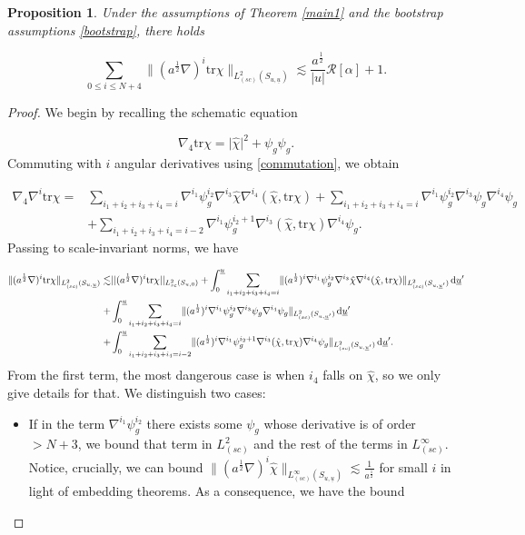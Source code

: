\documentclass{amsart}
\newtheorem{proposition}{Proposition}[section]
\newcommand{\aln}{(\al \nabla)^i}
\newcommand{\dubarprime}{\hspace{.5mm} \text{d} \ubar^{\prime}}
\newcommand{\intubar}{\int_0^{\ubar}}
\newcommand{\chihat}{\hat{\chi}}
\newcommand{\al}{a^{\frac{1}{2}}}
\newcommand{\ubar}{\underline{u}}
\newcommand{\sumifim}{\sum_{i_1+i_2+i_3+i_4=i-2}}
\newcommand{\scaleinfinitySu}[1]{\lVert{#1} \rVert_{L^\infty_{(sc)}(S_{u,\ubar})}}
\newcommand{\scaletwoSu}[1]{\lVert{#1} \rVert_{L^2_{(sc)}(S_{u,\ubar})}}
\newcommand{\scaletwoSuubarprime}[1]{\lVert{#1} \rVert_{L^2_{(sc)}(S_{u,\ubar^\prime})}}
\newcommand{\tr}{\mbox{tr}}
\begin{document}
{\begin{proposition}
\label{trchiprop}
Under the assumptions of Theorem \ref{main1} and the bootstrap assumptions \eqref{bootstrap}, there holds

\[ \sum_{0\leq i \leq N+4} \scaletwoSu{\aln \tr\chi}\lesssim \frac{a^{\frac{1}{2}}}{|u|}\mathcal{R}[\alpha]+1. \]
\end{proposition}

\begin{proof}
We begin by recalling the schematic equation

\[ \nabla_4 \tr\chi = \lvert \chihat \rvert^2 + \psi_g\psi_g. \]Commuting with $i$ angular derivatives using \ref{commutation}, we obtain

\begin{equation}
    \begin{split}
        \nabla_4 \nabla^i \tr\chi =& \sum_{i_1+i_2+i_3+i_4=i}\nabla^{i_1}\psi_g^{i_2}\nabla^{i_3}\chihat \nabla^{i_4}(\chihat, \tr\chi) +\sum_{i_1+i_2+i_3+i_4=i}\nabla^{i_1}\psi_g^{i_2}\nabla^{i_3}\psi_g \nabla^{i_4}\psi_g \\&+ \sumifim \nabla^{i_1}\psi_g^{i_2+1}\nabla^{i_3}(\chihat,\tr\chi)\nabla^{i_4}\psi_g .
    \end{split}
\end{equation}
Passing to scale-invariant norms, we have

\begin{equation}
    \begin{split}
        \scaletwoSu{\aln\tr\chi} \lesssim &||\aln\tr\chi||_{L^{2}_{sc}(S_{u,0})}+\intubar\sum_{i_1+i_2+i_3+i_4=i} \scaletwoSuubarprime{(\al)^i\nabla^{i_1}\psi_g^{i_2}\nabla^{i_3}\chihat \nabla^{i_4}(\chihat, \tr\chi)} \dubarprime \\+& \intubar \sum_{i_1+i_2+i_3+i_4=i}\scaletwoSuubarprime{(\al)^i\nabla^{i_1}\psi_g^{i_2}\nabla^{i_3}\psi_g \nabla^{i_4}\psi_g}\dubarprime \\ +& \intubar \sum_{i_1+i_2+i_3+i_4=i-2}\scaletwoSuubarprime{(\al)^i\nabla^{i_1}\psi_g^{i_2+1}\nabla^{i_3}(\chihat,\tr\chi) \nabla^{i_4}\psi_g}\dubarprime.  
    \end{split}
\end{equation}From the first term, the most dangerous case is when $i_4$ falls on $\chihat$, so we only give details for that. We distinguish two cases:

\begin{itemize}
    \item If in the term $\nabla^{i_1}\psi_g^{i_2}$ there exists some $\psi_g$ whose derivative is of order $>N+3$, we bound that term in $L^2_{(sc)}$ and the rest of the terms in $L^{\infty}_{(sc)}$. Notice, crucially, we can bound $\scaleinfinitySu{\aln \chihat} \lesssim \frac{1}{a^{\frac{1}{2}}}$ for small $i$ in light of embedding theorems. As a consequence, we have the bound 
    

\end{itemize}
\end{proof}}
\end{document}

